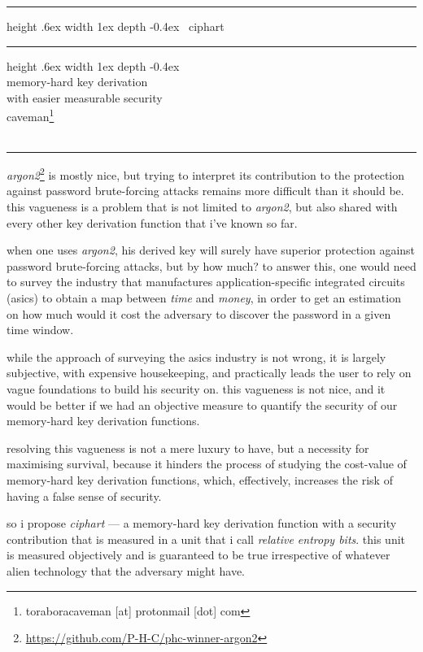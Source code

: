 \documentclass[twocolumn]{article}
\makeatletter
\def\myrulefill{%
    \leavevmode\leaders\hrule%
    height .6ex width 1ex depth -0.4ex%
    \hfill\kern\z@%
}
\makeatother
\begin{document}
\SetInd{.15em}{1em}

\begin{center}
\Huge
\myrulefill\ ciphart \myrulefill\\
\LARGE
memory-hard key derivation \\
with easier measurable security\\
\normalsize
caveman\footnote{toraboracaveman [at] protonmail [dot] com}\\
\footnotesize
\DTMnow\\
\rule{1\columnwidth}{2pt}
\end{center}

\emph{argon2}\footnote{\url{https://github.com/P-H-C/phc-winner-argon2}} is
mostly nice, but trying to interpret its contribution to the protection
against password brute-forcing attacks remains more difficult than it
should be.  this vagueness is a problem that is not limited to
\emph{argon2}, but also shared with every other key derivation function
that i've known so far.

when one uses \emph{argon2}, his derived key will surely have superior
protection against password brute-forcing attacks, but by how much?  to
answer this, one would need to survey the industry that manufactures
application-specific integrated circuits (asics) to obtain a map between
\emph{time} and \emph{money}, in order to get an estimation on how much
would it cost the adversary to discover the password in a given time
window.

while the approach of surveying the asics industry is not wrong, it is
largely subjective, with expensive housekeeping, and practically leads the
user to rely on vague foundations to build his security on.  this vagueness
is not nice, and it would be better if we had an objective measure to
quantify the security of our memory-hard key derivation functions.

resolving this vagueness is not a mere luxury to have, but a necessity for
maximising survival, because it hinders the process of studying the
cost-value of memory-hard key derivation functions, which, effectively,
increases the risk of having a false sense of security.

so i propose \emph{ciphart} --- a memory-hard key derivation function with
a security contribution that is measured in a unit that i call
\emph{relative entropy bits}.  this unit is measured objectively and is
guaranteed to be true irrespective of whatever alien technology that the
adversary might have.
\end{document}
